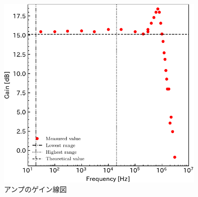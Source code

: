 \documentclass[report.tex]{subfiles}
\begin{document}
\begin{figure}[H]
	\centering
	\includegraphics[width=10cm]{fig/gain.pdf}
	\caption{アンプのゲイン線図}
	\label{fig:gain}
\end{figure}
\end{document}
